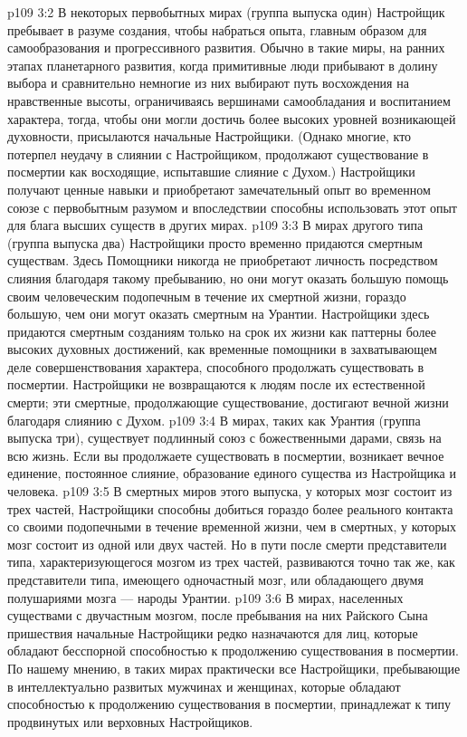 \vs p109 3:2 В некоторых первобытных мирах (группа выпуска один) Настройщик пребывает в разуме создания, чтобы набраться опыта, главным образом для самообразования и прогрессивного развития. Обычно в такие миры, на ранних этапах планетарного развития, когда примитивные люди прибывают в долину выбора и сравнительно немногие из них выбирают путь восхождения на нравственные высоты, ограничиваясь вершинами самообладания и воспитанием характера, тогда, чтобы они могли достичь более высоких уровней возникающей духовности, присылаются начальные Настройщики. (Однако многие, кто потерпел неудачу в слиянии с Настройщиком, продолжают существование в посмертии как восходящие, испытавшие слияние с Духом.) Настройщики получают ценные навыки и приобретают замечательный опыт во временном союзе с первобытным разумом и впоследствии способны использовать этот опыт для блага высших существ в других мирах. 
\vs p109 3:3 В мирах другого типа (группа выпуска два) Настройщики просто временно придаются смертным существам. Здесь Помощники никогда не приобретают личность посредством слияния благодаря такому пребыванию, но они могут оказать большую помощь своим человеческим подопечным в течение их смертной жизни, гораздо большую, чем они могут оказать смертным на Урантии. Настройщики здесь придаются смертным созданиям только на срок их жизни как паттерны более высоких духовных достижений, как временные помощники в захватывающем деле совершенствования характера, способного продолжать существовать в посмертии. Настройщики не возвращаются к людям после их естественной смерти; эти смертные, продолжающие существование, достигают вечной жизни благодаря слиянию с Духом.
\vs p109 3:4 В мирах, таких как Урантия (группа выпуска три), существует подлинный союз с божественными дарами, связь на всю жизнь. Если вы продолжаете существовать в посмертии, возникает вечное единение, постоянное слияние, образование единого существа из Настройщика и человека.
\vs p109 3:5 В смертных миров этого выпуска, у которых мозг состоит из трех частей, Настройщики способны добиться гораздо более реального контакта со своими подопечными в течение временной жизни, чем в смертных, у которых мозг состоит из одной или двух частей. Но в пути после смерти представители типа, характеризующегося мозгом из трех частей, развиваются точно так же, как представители типа, имеющего одночастный мозг, или обладающего двумя полушариями мозга --- народы Урантии.
\vs p109 3:6 В мирах, населенных существами с двучастным мозгом, после пребывания на них Райского Сына пришествия начальные Настройщики редко назначаются для лиц, которые обладают бесспорной способностью к продолжению существования в посмертии. По нашему мнению, в таких мирах практически все Настройщики, пребывающие в интеллектуально развитых мужчинах и женщинах, которые обладают способностью к продолжению существования в посмертии, принадлежат к типу продвинутых или верховных Настройщиков.
